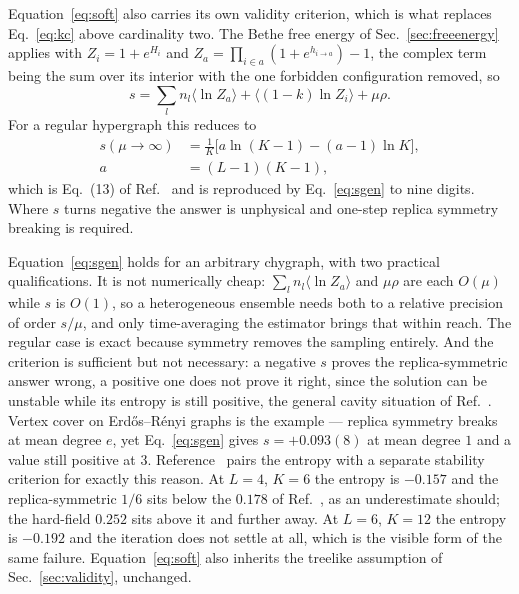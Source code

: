 \documentclass[aps,pre,twocolumn,superscriptaddress,floatfix]{revtex4-2}
\newcommand{\ave}[1]{\langle #1 \rangle}
\begin{document}
Equation~\eqref{eq:soft} also carries its own validity criterion, which is what
replaces Eq.~\eqref{eq:kc} above cardinality two. The Bethe free energy of
Sec.~\ref{sec:freeenergy} applies with
$Z_i=1+e^{H_i}$ and $Z_a=\prod_{i\in a}(1+e^{h_{i\to a}})-1$, the complex term
being the sum over its interior with the one forbidden configuration removed, so
\begin{equation}
  s=\sum_l n_l\ave{\ln Z_a}+\ave{(1-k)\ln Z_i}+\mu\rho .
  \label{eq:sgen}
\end{equation}
For a regular hypergraph this reduces to
\begin{equation}
  \begin{split}
    s(\mu\to\infty)&=\frac{1}{K}\Big[a\ln(K-1)-(a-1)\ln K\Big],\\
    a&=(L-1)(K-1),
  \end{split}
  \label{eq:entropy}
\end{equation}
which is Eq.~(13) of Ref.~\cite{MT07} and is reproduced by
Eq.~\eqref{eq:sgen} to nine digits. Where $s$ turns negative the answer is
unphysical and one-step replica symmetry breaking is required.

Equation~\eqref{eq:sgen} holds for an arbitrary chygraph, with two practical
qualifications. It is not numerically cheap: $\sum_l n_l\ave{\ln Z_a}$ and
$\mu\rho$ are each $O(\mu)$ while $s$ is $O(1)$, so a heterogeneous ensemble
needs both to a relative precision of order $s/\mu$, and only time-averaging the
estimator brings that within reach. The regular case is exact because symmetry
removes the sampling entirely. And the criterion is sufficient but not
necessary: a negative $s$ proves the replica-symmetric answer wrong, a positive
one does not prove it right, since the solution can be unstable while its
entropy is still positive, the general cavity situation of Ref.~\cite{MP01}. Vertex cover on Erd\H{o}s--R\'enyi graphs is the
example --- replica symmetry breaks at mean degree $e$, yet
Eq.~\eqref{eq:sgen} gives $s=+0.093(8)$ at mean degree $1$ and a value still
positive at $3$. Reference~\cite{MT07} pairs the entropy with a separate
stability criterion for exactly this reason. At $L=4$, $K=6$ the entropy is $-0.157$ and the
replica-symmetric $1/6$ sits below the $0.178$ of Ref.~\cite{MT07}, as an
underestimate should; the hard-field $0.252$ sits above it and further away. At
$L=6$, $K=12$ the entropy is $-0.192$ and the iteration does not settle at all,
which is the visible form of the same failure. Equation~\eqref{eq:soft} also
inherits the treelike assumption of Sec.~\ref{sec:validity}, unchanged.
\end{document}
